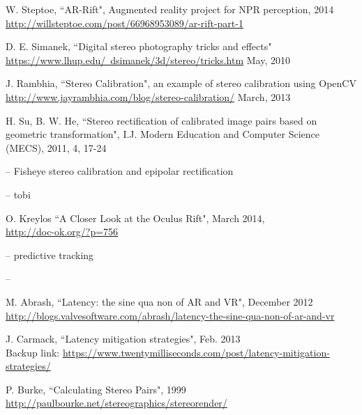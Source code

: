 \begin{thebibliography}{99}
W. Steptoe,
``AR-Rift", Augmented reality project for NPR perception, 2014 \\ \href{http://willsteptoe.com/post/66968953089/ar-rift-part-1}{http://willsteptoe.com/post/66968953089/ar-rift-part-1}

D. E. Simanek,
``Digital stereo photography tricks and effects" \\ \href{https://www.lhup.edu/~dsimanek/3d/stereo/tricks.htm}{https://www.lhup.edu/~dsimanek/3d/stereo/tricks.htm}
May, 2010

J. Rambhia,
``Stereo Calibration", an example of stereo calibration using OpenCV \\ \href{http://www.jayrambhia.com/blog/stereo-calibration/}{http://www.jayrambhia.com/blog/stereo-calibration/}
March, 2013

H. Su, B. W. He,
``Stereo rectification of calibrated image pairs based on geometric transformation",
I.J. Modern Education and Computer Science (MECS), 2011, 4, 17-24


 -- Fisheye stereo calibration and epipolar rectification

-- tobi

O. Kreylos
``A Closer Look at the Oculus Rift", March 2014, \\ \href{http://doc-ok.org/?p=756}{http://doc-ok.org/?p=756}

-- predictive tracking

 --

M. Abrash,
``Latency: the sine qua non of AR and VR", December 2012 \\ \href{http://blogs.valvesoftware.com/abrash/latency-the-sine-qua-non-of-ar-and-vr}{http://blogs.valvesoftware.com/abrash/latency-the-sine-qua-non-of-ar-and-vr}

J. Carmack, ``Latency mitigation strategies", Feb. 2013 \\ Backup link: \href{https://www.twentymilliseconds.com/post/latency-mitigation-strategies/}{https://www.twentymilliseconds.com/post/latency-mitigation-strategies/}






P. Burke,
``Calculating Stereo Pairs", 1999 \\ \href{http://paulbourke.net/stereographics/stereorender/}{http://paulbourke.net/stereographics/stereorender/}


\end{thebibliography}

